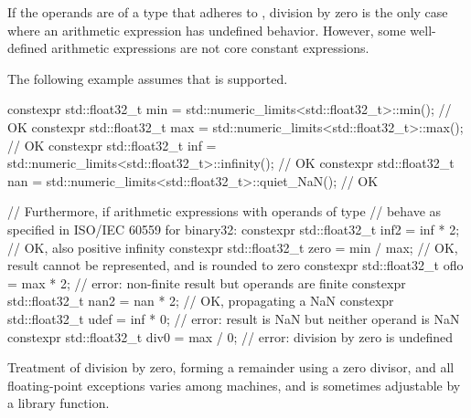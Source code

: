 \begin{note}
If the operands are of a type that adheres to \IsoFloatUndated,
division by zero is the only case
where an arithmetic expression has undefined behavior.
However, some well-defined arithmetic expressions
are not core constant expressions.
\begin{example}
The following example assumes that  is supported.
\begin{codeblock}
constexpr std::float32_t min = std::numeric_limits<std::float32_t>::min();          // OK
constexpr std::float32_t max = std::numeric_limits<std::float32_t>::max();          // OK
constexpr std::float32_t inf = std::numeric_limits<std::float32_t>::infinity();     // OK
constexpr std::float32_t nan = std::numeric_limits<std::float32_t>::quiet_NaN();    // OK

// Furthermore, if arithmetic expressions with operands of type 
// behave as specified in ISO/IEC 60559 for binary32:
constexpr std::float32_t inf2 = inf * 2;    // OK, also positive infinity
constexpr std::float32_t zero = min / max;  // OK, result cannot be represented, and is rounded to zero
constexpr std::float32_t oflo = max * 2;    // error: non-finite result but operands are finite
constexpr std::float32_t nan2 = nan * 2;    // OK, propagating a NaN
constexpr std::float32_t udef = inf * 0;    // error: result is NaN but neither operand is NaN
constexpr std::float32_t div0 = max / 0;    // error: division by zero is undefined
\end{codeblock}
\end{example}
\end{note}
\begin{note}
%
Treatment of division by zero, forming a remainder using a zero divisor,
and all floating-point exceptions varies among machines, and is sometimes
adjustable by a library function.
\end{note}



